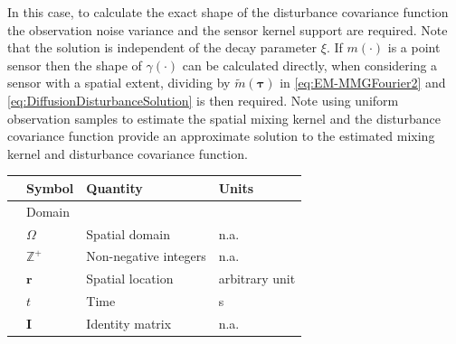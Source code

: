 \documentclass[10pt,twocolumn,twoside]{IEEEtran}
\begin{document}
In this case, to calculate the exact shape of the disturbance covariance function the observation noise variance and the sensor kernel support are required. Note that the solution is independent of the decay parameter $\xi$. If $m(\cdot)$ is a point sensor then the shape of $\gamma(\cdot)$ can be calculated directly, when considering a sensor with a spatial extent, dividing by $\tilde{m}(\boldsymbol\tau)$ in \eqref{eq:EM-MMGFourier2} and \eqref{eq:DiffusionDisturbanceSolution}  is then required. 
Note using uniform observation samples to estimate the spatial mixing kernel and the disturbance covariance function provide an approximate solution to the estimated  mixing kernel and disturbance covariance function. 
\begin {table}[t]
\begin{center}
	{\tiny\begin{tabular}{llll}
	\hline \hline
	& Symbol & Quantity & Units\\ 
	\hline 
	& Domain&& \\
	& $\Omega$ &Spatial domain& n.a. \\ 
	& $\mathbb{Z}^{+}$ &Non-negative integers& n.a. \\ 
	& $\mathbf{r}$ &Spatial location& arbitrary unit\\ 
	& $t$ &Time & s \\  
	& $\mathbf I$ & Identity matrix & n.a. \\ 


\end{tabular}}
\end{center}
\end{table}
\end{document}
